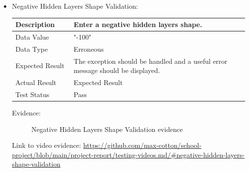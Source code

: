 \documentclass[./project-report/src/latex/project-report.tex]{subfiles}
\begin{document}
\begin{itemize}
		\pagebreak

	\item Negative Hidden Layers Shape Validation: \newline\newline
		\begin{tabular}{|p{0.25\linewidth}|p{0.75\linewidth}|}
			\hline
			Description & Enter a negative hidden layers shape. \\
			\hline
			Data Value & "-100" \\
			\hline
			Data Type & Erroneous \\
			\hline
			Expected Result & The exception should be handled and a useful error message should be displayed. \\
			\hline
			Actual Result & Expected Result \\
			\hline
			Test Status & Pass \\
			\hline
		\end{tabular}

		\vspace{5mm}

		Evidence:
		\begin{figure}[h!]
		\centering
		\caption{Negative Hidden Layers Shape Validation evidence}
		\end{figure}

		\begin{sloppypar}
		Link to video evidence: \url{https://github.com/max-cotton/school-project/blob/main/project-report/testing-videos.md/#negative-hidden-layers-shape-validation}
		\end{sloppypar}


\end{itemize}
\end{document}
